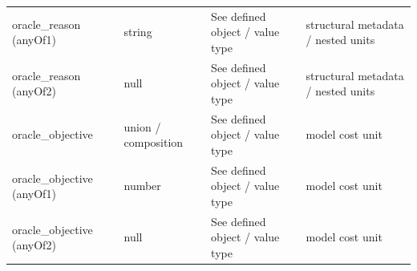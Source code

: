\begin{longtable}{@{}>{\raggedright\arraybackslash}p{}>{\raggedright\arraybackslash}p{}>{\raggedright\arraybackslash}p{}>{\raggedright\arraybackslash}p{}@{}}
oracle\_\allowbreak{}reason (anyOf1) & string & See defined object /\allowbreak{} value type & structural metadata /\allowbreak{} nested units\\
oracle\_\allowbreak{}reason (anyOf2) & null & See defined object /\allowbreak{} value type & structural metadata /\allowbreak{} nested units\\
oracle\_\allowbreak{}objective & union /\allowbreak{} composition & See defined object /\allowbreak{} value type & model cost unit\\
oracle\_\allowbreak{}objective (anyOf1) & number & See defined object /\allowbreak{} value type & model cost unit\\
oracle\_\allowbreak{}objective (anyOf2) & null & See defined object /\allowbreak{} value type & model cost unit\\
\end{longtable}\endgroup
